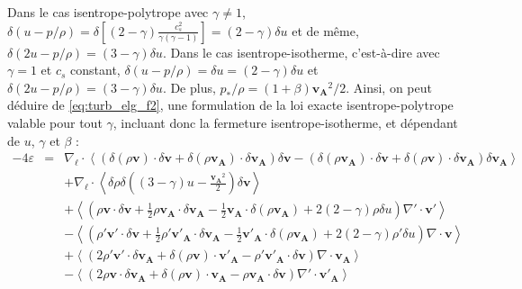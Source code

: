 Dans le cas isentrope-polytrope avec $\gamma \neq 1$, $\delta \left(u - p/\rho\right) = \delta [\left(2-\gamma\right)\frac{c^2_s}{\gamma\left(\gamma-1\right)}] = \left(2-\gamma\right)\delta u$ et de même, $\delta \left(2u - p/\rho\right) = \left(3-\gamma\right)\delta u$. Dans le cas isentrope-isotherme, c'est-à-dire avec $\gamma = 1$ et $c_s$ constant, $\delta \left(u - p/\rho\right) = \delta u = \left(2-\gamma\right)\delta u$ et  $\delta \left(2u - p/\rho\right) = \left(3-\gamma\right)\delta u$. De plus, $p_*/\rho = \left(1+\beta\right) \boldsymbol{v_A}^2/2 $. Ainsi, on peut déduire de \eqref{eq:turb_elg_f2}, une formulation de la loi exacte isentrope-polytrope valable pour tout $\gamma$, incluant donc la fermeture isentrope-isotherme, et dépendant de $u$, $\gamma$ et $\beta$ : 
\begin{equation}
\boxed{
\begin{array}{lcl}
\label{eq:turb_elpol_f2}-4\varepsilon &=& \nabla_{\boldsymbol{\ell}} \cdot \left<\left(\delta \left(\rho\boldsymbol{v}\right) \cdot \delta \boldsymbol{v}+ \delta \left(\rho\boldsymbol{v_A}\right) \cdot \delta \boldsymbol{v_A}\right) \delta \boldsymbol{v}  -\left(\delta \left(\rho\boldsymbol{v_A}\right) \cdot \delta \boldsymbol{v}  + \delta \left(\rho\boldsymbol{v}\right) \cdot \delta \boldsymbol{v_A}  \right) \delta \boldsymbol{v_A} \right>\\
&& + \nabla_{\boldsymbol{\ell}} \cdot \left<\delta \rho  \delta \left(\left(3-\gamma\right)u - \frac{\boldsymbol{v_A}^2}{2}\right)\delta \boldsymbol{v}\right> \\
&& +\left< \left(\rho \boldsymbol{v} \cdot \delta \boldsymbol{v} +\frac{1}{2} \rho \boldsymbol{v_A} \cdot \delta \boldsymbol{v_A} -\frac{1}{2} \boldsymbol{v_A} \cdot \delta \left(\rho \boldsymbol{v_A}\right) + 2 \left(2-\gamma\right)\rho \delta u \right) \nabla' \cdot \boldsymbol{v'} \right>\\
&& -\left< \left(\rho' \boldsymbol{v'} \cdot \delta \boldsymbol{v} +\frac{1}{2} \rho' \boldsymbol{v'_A} \cdot \delta \boldsymbol{v_A} -\frac{1}{2} \boldsymbol{v'_A} \cdot \delta \left(\rho \boldsymbol{v_A}\right) + 2\left(2-\gamma\right)\rho' \delta u   \right)\nabla \cdot \boldsymbol{v}\right>\\
&&+ \left<\left(2 \rho' \boldsymbol{v'} \cdot \delta \boldsymbol{v_A}+ \delta\left(\rho \boldsymbol{v}\right) \cdot \boldsymbol{v'_A} - \rho' \boldsymbol{v'_A} \cdot \delta \boldsymbol{v}  \right)\nabla \cdot \boldsymbol{v_A}\right>\\
&&- \left<\left(2\rho \boldsymbol{v} \cdot \delta \boldsymbol{v_A} + \delta\left(\rho \boldsymbol{v}\right) \cdot \boldsymbol{v_A} - \rho \boldsymbol{v_A} \cdot \delta \boldsymbol{v}  \right)\nabla' \cdot \boldsymbol{v'_A}\right> \\

\end{array}}
\end{equation}
